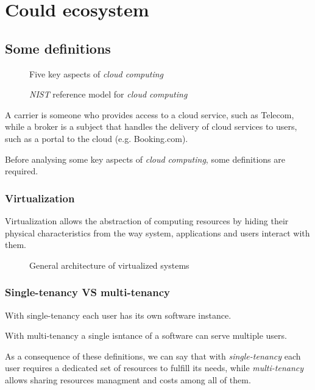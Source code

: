 \chapter{Could ecosystem}
\section{Some definitions}
\begin{figure}[h!]
    \centering
    \caption{Five key aspects of \emph{cloud computing}}
\end{figure}
\begin{figure}[h!]
    \centering
    \caption{\emph{NIST} reference model for \emph{cloud computing}}
\end{figure}
\begin{note}
    A carrier is someone who provides access to a cloud service, such as
    Telecom, while a broker is a subject that handles the delivery of cloud
    services to users, such as a portal to the cloud (e.g. Booking.com).
\end{note}

\noindent Before analysing some key aspects of \emph{cloud computing}, some
definitions are required.

\subsection{Virtualization}
\begin{definition}[Virtualization]
    Virtualization allows the abstraction of computing resources by hiding
    their physical characteristics from the way system, applications and users
    interact with them.
\end{definition}

\begin{figure}[h!]
    \centering
    \hspace{1.5cm}
    \caption{General architecture of virtualized systems}
\end{figure}

\subsection{Single-tenancy VS multi-tenancy}
\begin{definition}
    With single-tenancy each user has its own software instance.
\end{definition}
\begin{definition}
    With multi-tenancy a single isntance of a software can serve multiple users.
\end{definition}\noindent
As a consequence of these definitions, we can say that with \emph{single-tenancy}
each user requires a dedicated set of resources to fulfill its needs, while
\emph{multi-tenancy} allows sharing resources managment and costs among all of
them.

